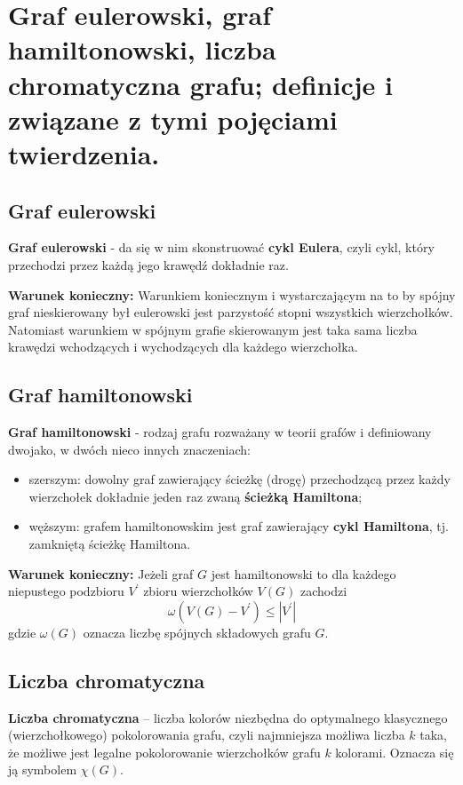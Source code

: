 \section{Graf eulerowski, graf hamiltonowski, liczba chromatyczna grafu; definicje i związane z tymi pojęciami twierdzenia.}

\subsection{Graf eulerowski}
\textbf{Graf eulerowski} - da się w nim skonstruować \textbf{cykl Eulera}, czyli cykl,
który przechodzi przez każdą jego krawędź dokładnie raz.

\textbf{Warunek konieczny:} Warunkiem koniecznym i wystarczającym na to by spójny graf nieskierowany był eulerowski jest parzystość stopni wszystkich wierzchołków.
Natomiast warunkiem w spójnym grafie skierowanym jest taka sama liczba krawędzi wchodzących i wychodzących dla każdego wierzchołka.

\subsection{Graf hamiltonowski}
\textbf{Graf hamiltonowski} - rodzaj grafu rozważany w teorii grafów i definiowany dwojako, w dwóch nieco innych znaczeniach:
\begin{itemize}
    \item szerszym: dowolny graf zawierający ścieżkę (drogę) przechodzącą przez każdy wierzchołek dokładnie jeden raz zwaną \textbf{ścieżką Hamiltona};
    \item węższym: grafem hamiltonowskim jest graf zawierający \textbf{cykl Hamiltona}, tj. zamkniętą ścieżkę Hamiltona.
\end{itemize}

\textbf{Warunek konieczny:} Jeżeli graf $G$ jest hamiltonowski to dla każdego niepustego podzbioru $V^{\prime}$ zbioru wierzchołków $V(G)$ zachodzi
\[
    \omega(V(G) - V^{\prime}) \leqslant \left| V^{\prime} \right|
\]
gdzie $\omega (G)$ oznacza liczbę spójnych składowych grafu $G$.

\subsection{Liczba chromatyczna}

\textbf{Liczba chromatyczna} – liczba kolorów niezbędna do optymalnego klasycznego (wierzchołkowego) pokolorowania grafu,
czyli najmniejsza możliwa liczba $k$ taka, że możliwe jest legalne pokolorowanie wierzchołków grafu $k$ kolorami.
Oznacza się ją symbolem $\chi (G)$.

